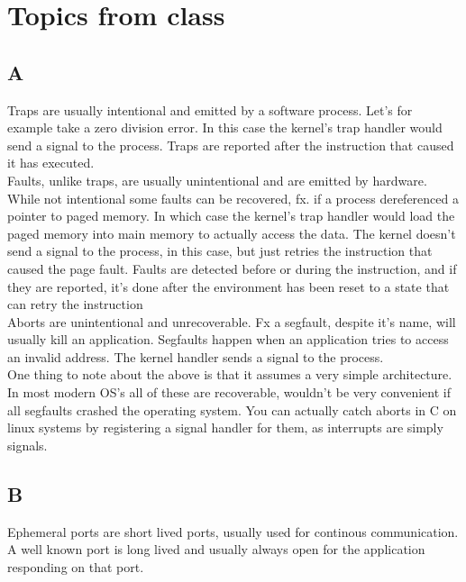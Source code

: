 \documentclass[11pt]{report}
\begin{document}
\chapter{Topics from class}
\section{A}
Traps are usually intentional and emitted by a software process. Let's for example take a zero division error. In this case the kernel's trap handler would send a signal to the process. Traps are reported after the instruction that caused it has executed.\\[1ex]

Faults, unlike traps, are usually unintentional and are emitted by hardware. While not intentional some faults can be recovered, fx. if a process dereferenced a pointer to paged memory. In which case the kernel's trap handler would load the paged memory into main memory to actually access the data. The kernel doesn't send a signal to the process, in this case, but just retries the instruction that caused the page fault. Faults are detected before or during the instruction, and if they are reported, it's done after the environment has been reset to a state that can retry the instruction\\[1ex]

Aborts are unintentional and unrecoverable. Fx a segfault, despite it's name, will usually kill an application. Segfaults happen when an application tries to access an invalid address. The kernel handler sends a signal to the process.\\[1ex]

One thing to note about the above is that it assumes a very simple architecture. In most modern OS's all of these are recoverable, wouldn't be very convenient if all segfaults crashed the operating system. You can actually catch aborts in C on linux systems by registering a signal handler for them, as interrupts are simply signals. 

\section{B}
Ephemeral ports are short lived ports, usually used for continous communication. A well known port is long lived and usually always open for the application responding on that port.
\end{document}
